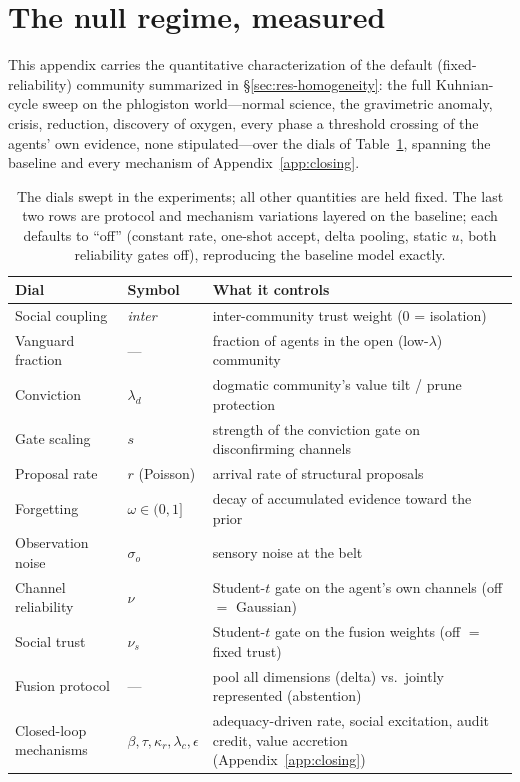 \documentclass[runningheads]{llncs}
\begin{document}
\section{The null regime, measured}
\label{app:null}

This appendix carries the quantitative characterization of the default (fixed-reliability)
community summarized in \S\ref{sec:res-homogeneity}: the full Kuhnian-cycle sweep on the
phlogiston world---normal science, the gravimetric anomaly, crisis, reduction, discovery of
oxygen, every phase a threshold crossing of the agents' own evidence, none stipulated---over
the dials of Table~\ref{tab:dials}, spanning the baseline and every mechanism of
Appendix~\ref{app:closing}.

\begin{table}[h!]
\centering\footnotesize
\begin{tabular}{lll}
\hline
Dial & Symbol & What it controls \\
\hline
Social coupling & \emph{inter} & inter-community trust weight (0 = isolation) \\
Vanguard fraction & --- & fraction of agents in the open (low-$\lambda$) community \\
Conviction & $\lambda_d$ & dogmatic community's value tilt / prune protection \\
Gate scaling & $s$ & strength of the conviction gate on disconfirming channels \\
Proposal rate & $r$ (Poisson) & arrival rate of structural proposals \\
Forgetting & $\omega\in(0,1]$ & decay of accumulated evidence toward the prior \\
Observation noise & $\sigma_o$ & sensory noise at the belt \\
Channel reliability & $\nu$ & Student-$t$ gate on the agent's own channels (off $=$ Gaussian) \\
Social trust & $\nu_s$ & Student-$t$ gate on the fusion weights (off $=$ fixed trust) \\
Fusion protocol & --- & pool all dimensions (delta) vs.\ jointly represented (abstention) \\
Closed-loop mechanisms & $\beta,\tau,\kappa_r,\lambda_c,\epsilon$ & adequacy-driven rate, social
excitation, audit credit, value accretion (Appendix~\ref{app:closing}) \\
\hline
\end{tabular}
\caption{The dials swept in the experiments; all other quantities are held fixed. The last two
rows are protocol and mechanism variations layered on the baseline; each defaults to ``off''
(constant rate, one-shot accept, delta pooling, static $u$, both reliability gates off),
reproducing the baseline model exactly.}
\label{tab:dials}
\end{table}
\end{document}
